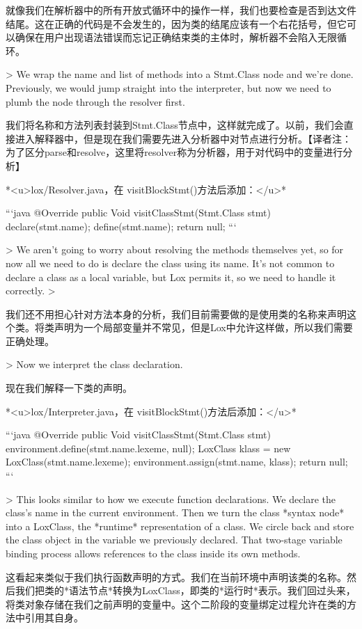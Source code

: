 \documentclass[cn,11pt,chinese]{elegantbook}
\begin{document}
{{{{{{{{{{{{{{{{{{{就像我们在解析器中的所有开放式循环中的操作一样，我们也要检查是否到达文件结尾。这在正确的代码是不会发生的，因为类的结尾应该有一个右花括号，但它可以确保在用户出现语法错误而忘记正确结束类的主体时，解析器不会陷入无限循环。

> We wrap the name and list of methods into a Stmt.Class node and we’re done. Previously, we would jump straight into the interpreter, but now we need to plumb the node through the resolver first.

我们将名称和方法列表封装到Stmt.Class节点中，这样就完成了。以前，我们会直接进入解释器中，但是现在我们需要先进入分析器中对节点进行分析。【译者注：为了区分parse和resolve，这里将resolver称为分析器，用于对代码中的变量进行分析】

*<u>lox/Resolver.java，在 visitBlockStmt()方法后添加：</u>*

```java
  @Override
  public Void visitClassStmt(Stmt.Class stmt) {
    declare(stmt.name);
    define(stmt.name);
    return null;
  }
```

> We aren’t going to worry about resolving the methods themselves yet, so for now all we need to do is declare the class using its name. It’s not common to declare a class as a local variable, but Lox permits it, so we need to handle it correctly.
>

我们还不用担心针对方法本身的分析，我们目前需要做的是使用类的名称来声明这个类。将类声明为一个局部变量并不常见，但是Lox中允许这样做，所以我们需要正确处理。

> Now we interpret the class declaration.

现在我们解释一下类的声明。

*<u>lox/Interpreter.java，在 visitBlockStmt()方法后添加：</u>*

```java
  @Override
  public Void visitClassStmt(Stmt.Class stmt) {
    environment.define(stmt.name.lexeme, null);
    LoxClass klass = new LoxClass(stmt.name.lexeme);
    environment.assign(stmt.name, klass);
    return null;
  }
```

> This looks similar to how we execute function declarations. We declare the class’s name in the current environment. Then we turn the class *syntax node* into a LoxClass, the *runtime* representation of a class. We circle back and store the class object in the variable we previously declared. That two-stage variable binding process allows references to the class inside its own methods.

这看起来类似于我们执行函数声明的方式。我们在当前环境中声明该类的名称。然后我们把类的*语法节点*转换为LoxClass，即类的*运行时*表示。我们回过头来，将类对象存储在我们之前声明的变量中。这个二阶段的变量绑定过程允许在类的方法中引用其自身。

}}}}}}}}}}}}}}}}}}}
\end{document}
